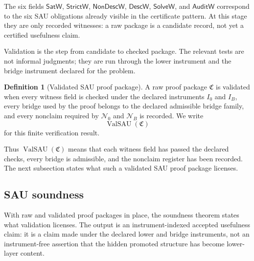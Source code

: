 \documentclass[11pt]{article}
\theoremstyle{definition}
\newtheorem{definition}[theorem]{Definition}
\begin{document}
The six fields \(\mathsf{SatW}\), \(\mathsf{StrictW}\),
\(\mathsf{NonDescW}\), \(\mathsf{DescW}\), \(\mathsf{SolveW}\), and
\(\mathsf{AuditW}\) correspond to the six SAU obligations already visible in
the certificate pattern.  At this stage they are only recorded witnesses: a raw
package is a candidate record, not yet a certified usefulness claim.

Validation is the step from candidate to checked package.  The relevant tests
are not informal judgments; they are run through the lower instrument and the
bridge instrument declared for the problem.

\begin{definition}[Validated SAU proof package]
\label{def:sau-validated-proof-package}
A raw proof package \(\mathfrak C\) is validated when every witness field is checked under the declared instruments \(I_0\) and \(I_B\), every bridge used by the proof belongs to the declared admissible bridge family, and every nonclaim required by \(\mathcal N_0\) and \(\mathcal N_B\) is recorded.  We write
\[
\operatorname{ValSAU}(\mathfrak C)
\]
for this finite verification result.
\end{definition}

Thus \(\operatorname{ValSAU}(\mathfrak C)\) means that each witness field has
passed the declared checks, every bridge is admissible, and the nonclaim
register has been recorded.  The next subsection states what such a validated
SAU proof package licenses.

\subsection{SAU soundness}
\label{subsec:soundness-sau-soundness}

With raw and validated proof packages in place, the soundness theorem states
what validation licenses.  The output is an instrument-indexed accepted
usefulness claim: it is a claim made under the declared lower and bridge
instruments, not an instrument-free assertion that the hidden promoted
structure has become lower-layer content.
\end{document}
